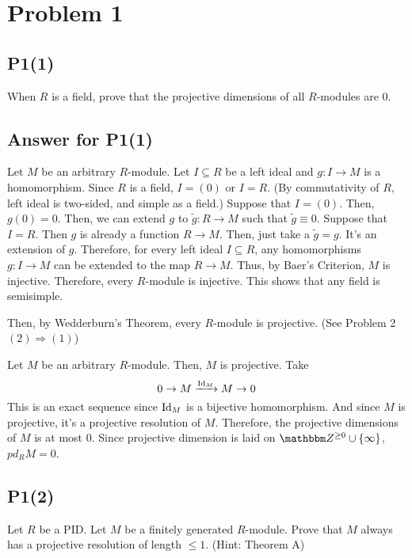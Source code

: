 \section*{Problem 1}

\subsection*{P1(1)}
When \(R\) is a field,
prove that the projective dimensions of all \(R\)-modules are 0.

\subsection*{Answer for P1(1)}

Let \(M\) be an arbitrary \(R\)-module.
Let \(I \subseteq R\) be a left ideal and \(g: I \to M\) is a homomorphism.
Since \(R\) is a field, \(I = (0)\) or \(I = R\).
(By commutativity of \(R\), left ideal is two-sided,
and simple as a field.)
Suppose that \(I = (0)\).
Then, \(g(0) = 0\).
Then, we can extend \(g\) to \(\tilde g: R \to M\) such that \(\tilde g \equiv 0\).
Suppose that \(I = R\).
Then \(g\) is already a function \(R \to M\).
Then, just take a \(\tilde g = g\).
It's an extension of \(g\).
Therefore, for every left ideal \(I \subseteq R\),
any homomorphisms \(g: I \to M\) can be extended to the map \(R \to M\).
Thus, by Baer's Criterion, \(M\) is injective.
Therefore, every \(R\)-module is injective.
This shows that any field is semisimple.

Then, by Wedderburn's Theorem,
every \(R\)-module is projective.
(See Problem 2 \((2) \Rightarrow (1)\))

Let \(M\) be an arbitrary \(R\)-module.
Then, \(M\) is projective.
Take
\[0 \to M \xrightarrow{\textnormal{Id}_M} M \to 0\]
This is an exact sequence since \(\textnormal{Id}_M\) is a bijective homomorphism.
And since \(M\) is projective,
it's a projective resolution of \(M\).
Therefore, the projective dimensions of \(M\) is at most 0.
Since projective dimension is laid on \(\bbZ^{\ge 0} \cup \{\infty\}\),
\(pd_R M = 0\).
\qedsq

\subsection*{P1(2)}
Let \(R\) be a PID.
Let \(M\) be a finitely generated \(R\)-module.
Prove that \(M\) always has a projective resolution
of length \(\le 1\).
(Hint: Theorem A)


